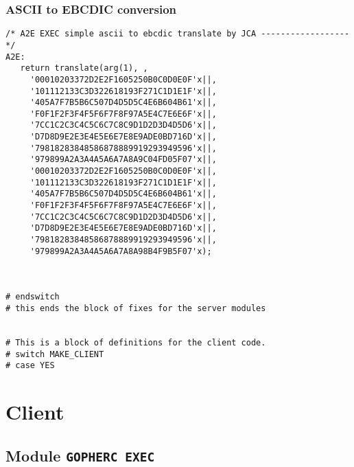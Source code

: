 \subsubsection{ASCII to EBCDIC conversion}

\def\LPtopF{ASCII to EBCDIC conversion}

\begin{verbatim}
/* A2E EXEC simple ascii to ebcdic translate by JCA ------------------ */
A2E:
   return translate(arg(1), ,
     '00010203372D2E2F1605250B0C0D0E0F'x||,
     '101112133C3D322618193F271C1D1E1F'x||,
     '405A7F7B5B6C507D4D5D5C4E6B604B61'x||,
     'F0F1F2F3F4F5F6F7F8F97A5E4C7E6E6F'x||,
     '7CC1C2C3C4C5C6C7C8C9D1D2D3D4D5D6'x||,
     'D7D8D9E2E3E4E5E6E7E8E9ADE0BD716D'x||,
     '79818283848586878889919293949596'x||,
     '979899A2A3A4A5A6A7A8A9C04FD05F07'x||,
     '00010203372D2E2F1605250B0C0D0E0F'x||,
     '101112133C3D322618193F271C1D1E1F'x||,
     '405A7F7B5B6C507D4D5D5C4E6B604B61'x||,
     'F0F1F2F3F4F5F6F7F8F97A5E4C7E6E6F'x||,
     '7CC1C2C3C4C5C6C7C8C9D1D2D3D4D5D6'x||,
     'D7D8D9E2E3E4E5E6E7E8E9ADE0BD716D'x||,
     '79818283848586878889919293949596'x||,
     '979899A2A3A4A5A6A7A8A98B4F9B5F07'x);



# endswitch
# this ends the block of fixes for the server modules


# This is a block of definitions for the client code.
# switch MAKE_CLIENT
# case YES
\end{verbatim}

\section{Client}

\def\LPtopC{Client}

\def\LPtopD{~}

\def\LPtopF{~}

\subsection{Module {\tt GOPHERC EXEC}}

\def\LPtopD{Module {\tt GOPHERC EXEC}}

\def\LPtopF{~}

